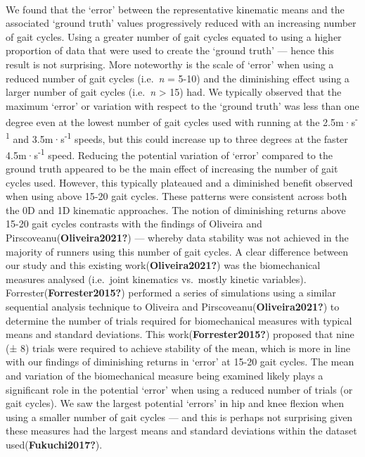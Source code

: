 \documentclass[]{elsarticle} %
\begin{document}
~

We found that the `error' between the representative kinematic means and
the associated `ground truth' values progressively reduced with an
increasing number of gait cycles. Using a greater number of gait cycles
equated to using a higher proportion of data that were used to create
the `ground truth' --- hence this result is not surprising. More
noteworthy is the scale of `error' when using a reduced number of gait
cycles (i.e.~\emph{n} = 5-10) and the diminishing effect using a larger
number of gait cycles (i.e.~\emph{n} \textgreater{} 15) had. We
typically observed that the maximum `error' or variation with respect to
the `ground truth' was less than one degree even at the lowest number of
gait cycles used with running at the 2.5m·s\textsuperscript{-1} and
3.5m·s\textsuperscript{-1} speeds, but this could increase up to three
degrees at the faster 4.5m·s\textsuperscript{-1} speed. Reducing the
potential variation of `error' compared to the ground truth appeared to
be the main effect of increasing the number of gait cycles used.
However, this typically plateaued and a diminished benefit observed when
using above 15-20 gait cycles. These patterns were consistent across
both the 0D and 1D kinematic approaches. The notion of diminishing
returns above 15-20 gait cycles contrasts with the findings of Oliveira
and Pirscoveanu(\textbf{Oliveira2021?}) --- whereby data stability was
not achieved in the majority of runners using this number of gait
cycles. A clear difference between our study and this existing
work(\textbf{Oliveira2021?}) was the biomechanical measures analysed
(i.e.~joint kinematics vs.~mostly kinetic variables).
Forrester(\textbf{Forrester2015?}) performed a series of simulations
using a similar sequential analysis technique to Oliveira and
Pirscoveanu(\textbf{Oliveira2021?}) to determine the number of trials
required for biomechanical measures with typical means and standard
deviations. This work(\textbf{Forrester2015?}) proposed that nine (± 8)
trials were required to achieve stability of the mean, which is more in
line with our findings of diminishing returns in `error' at 15-20 gait
cycles. The mean and variation of the biomechanical measure being
examined likely plays a significant role in the potential `error' when
using a reduced number of trials (or gait cycles). We saw the largest
potential `errors' in hip and knee flexion when using a smaller number
of gait cycles --- and this is perhaps not surprising given these
measures had the largest means and standard deviations within the
dataset used(\textbf{Fukuchi2017?}).
\end{document}
